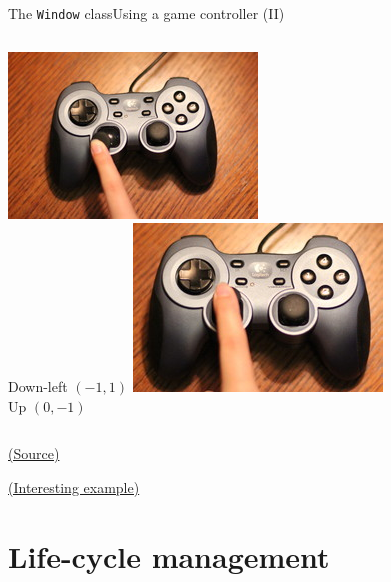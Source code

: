 \documentclass[10pt,compress]{beamer} %
\begin{document}
\begin{frame}{The \texttt{Window} class}{Using a game controller (II)}
\begin{columns}
		\includegraphics[width=\linewidth]{figs/controller-downleft.jpg}\\
		\centering Down-left $(-1, 1)$
		\includegraphics[width=\linewidth]{figs/controller-up.jpg}\\
		\centering Up $(0,-1)$
    \end{columns}

	\centering \tiny \href{https://learn.arcade.academy/en/latest/chapters/19\_user\_control/user\_control.html}{(Source)}

	\bigskip

	\normalsize
	\href{https://api.arcade.academy/en/2.6.17/examples/sprite\_move\_joystick.html}{(Interesting example)}

\end{frame}

\section{Life-cycle management}
\end{document}
